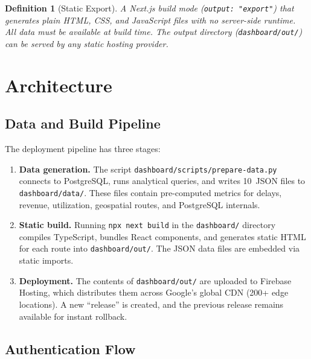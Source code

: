 \documentclass[11pt,a4paper]{article}
\theoremstyle{plainref}
\newtheorem{definition}{Definition}[section]
\begin{document}
\begin{definition}[Static Export]
A Next.js build mode (\texttt{output: "export"}) that generates plain HTML, CSS,
and JavaScript files with no server-side runtime. All data must be available at
build time. The output directory (\texttt{dashboard/out/}) can be served by any
static hosting provider.
\end{definition}

\section{Architecture}

\subsection{Data and Build Pipeline}

The deployment pipeline has three stages:

\begin{enumerate}[label=\textbf{Stage~\arabic*:}]
  \item \textbf{Data generation.} The script \texttt{dashboard/scripts/prepare-data.py}
        connects to PostgreSQL, runs analytical queries, and writes 10~JSON files to
        \texttt{dashboard/data/}. These files contain pre-computed metrics for delays,
        revenue, utilization, geospatial routes, and PostgreSQL internals.

  \item \textbf{Static build.} Running \texttt{npx next build} in the \texttt{dashboard/}
        directory compiles TypeScript, bundles React components, and generates static
        HTML for each route into \texttt{dashboard/out/}. The JSON data files are
        embedded via static imports.

  \item \textbf{Deployment.} The contents of \texttt{dashboard/out/} are uploaded to
        Firebase Hosting, which distributes them across Google's global CDN (200+
        edge locations). A new ``release'' is created, and the previous release
        remains available for instant rollback.
\end{enumerate}

\subsection{Authentication Flow}
\end{document}
